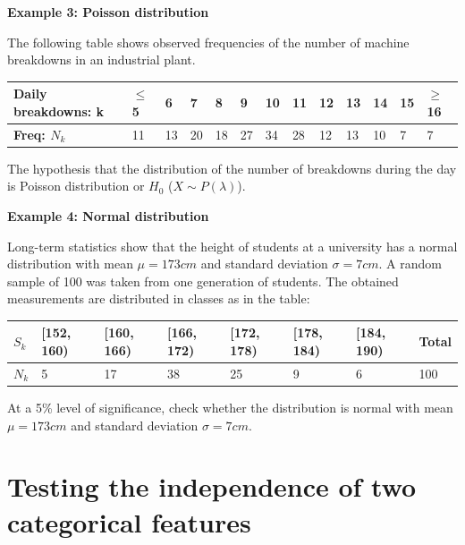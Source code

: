 \documentclass[a4paper, 12pt]{article}
\begin{document}
\textbf{Example 3: Poisson distribution}

The following table shows observed frequencies of the number
of machine breakdowns in an industrial plant.

\begin{table}[h!]
\centering
\begin{tabular}{|l|l|l|l|l|l|l|l|l|l|l|l|l|}
\hline
\textbf{Daily breakdowns: k} & \textbf{$\leq$5} & \textbf{6} & \textbf{7} & \textbf{8} & \textbf{9} & \textbf{10} & \textbf{11} & \textbf{12} & \textbf{13} & \textbf{14} & \textbf{15} & \textbf{$\geq$16} \\ \hline
\textbf{Freq: $N_k$}         & 11               & 13         & 20         & 18         & 27         & 34          & 28          & 12          & 13          & 10          & 7           & 7                 \\ \hline
\end{tabular}
\end{table}

The hypothesis that the distribution of the number of
breakdowns during the day is Poisson distribution or $H_0$ ($X\sim P(\lambda)$).


\textbf{Example 4: Normal distribution}


Long-term statistics show that the height of students at a
university has a normal distribution with mean $\mu = 173 cm$ and
standard deviation $\sigma = 7 cm$. A random sample of 100 was taken
from one generation of students. The obtained measurements are
distributed in classes as in the table:

\begin{table}[h!]
\centering
\begin{tabular}{|l|l|l|l|l|l|l|l|}
\hline
\textbf{$S_k$} & {[}152, 160) & {[}160, 166) & {[}166, 172) & {[}172, 178) & {[}178, 184) & {[}184, 190) & \textbf{Total} \\ \hline
\textbf{$N_k$} & 5            & 17           & 38           & 25           & 9            & 6            & 100            \\ \hline
\end{tabular}
\end{table}

At a 5\% level of significance, check whether the distribution is
normal with mean $\mu = 173 cm$ and standard deviation $\sigma = 7 cm$.


\section{Testing the independence of two categorical
features}
\end{document}
